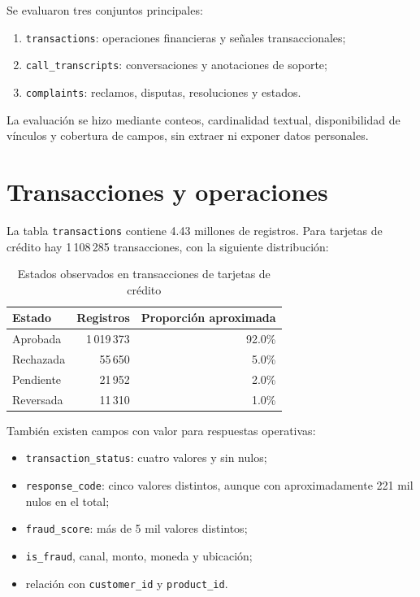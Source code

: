 \documentclass[11pt,a4paper]{article}
\begin{document}
Se evaluaron tres conjuntos principales:

\begin{enumerate}
  \item \texttt{transactions}: operaciones financieras y señales transaccionales;
  \item \texttt{call\_transcripts}: conversaciones y anotaciones de soporte;
  \item \texttt{complaints}: reclamos, disputas, resoluciones y estados.
\end{enumerate}

La evaluación se hizo mediante conteos, cardinalidad textual, disponibilidad de vínculos y cobertura de campos, sin extraer ni exponer datos personales.

\section{Transacciones y operaciones}

La tabla \texttt{transactions} contiene 4.43 millones de registros. Para tarjetas de crédito hay 1\,108\,285 transacciones, con la siguiente distribución:

\begin{table}[ht]
\centering
\caption{Estados observados en transacciones de tarjetas de crédito}
\begin{tabular}{lrr}
\toprule
Estado & Registros & Proporción aproximada \\
\midrule
Aprobada & 1\,019\,373 & 92.0\% \\
Rechazada & 55\,650 & 5.0\% \\
Pendiente & 21\,952 & 2.0\% \\
Reversada & 11\,310 & 1.0\% \\
\bottomrule
\end{tabular}
\end{table}

También existen campos con valor para respuestas operativas:

\begin{itemize}
  \item \texttt{transaction\_status}: cuatro valores y sin nulos;
  \item \texttt{response\_code}: cinco valores distintos, aunque con aproximadamente 221 mil nulos en el total;
  \item \texttt{fraud\_score}: más de 5 mil valores distintos;
  \item \texttt{is\_fraud}, canal, monto, moneda y ubicación;
  \item relación con \texttt{customer\_id} y \texttt{product\_id}.
\end{itemize}
\end{document}
